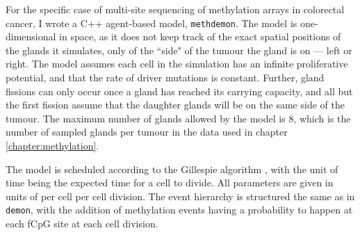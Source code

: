 For the specific case of multi-site sequencing of methylation arrays in colorectal cancer, I wrote
a C++ agent-based model, \texttt{methdemon}. The model is one-dimensional in space, as it does not
keep track of the exact spatial positions of the glands it simulates, only of the ``side" of the
tumour the gland is on --- left or right. The model assumes each cell in the simulation has an
infinite proliferative potential, and that the rate of driver mutations is constant. Further, gland
fissions can only occur once a gland has reached its carrying capacity, and all but the first fission
assume that the daughter glands will be on the same side of the tumour. The maximum number of glands
allowed by the model is $8$, which is the number of sampled glands per tumour in the data used in
chapter \ref{chapter:methylation}. \par
The model is scheduled according to the Gillespie algorithm \cite{gillespie_exact_1977}, with the
unit of time being the expected time for a cell to divide. All parameters are given in units of per
cell per cell division. The event hierarchy is structured the same as in \texttt{demon}, with the
addition of methylation events having a probability to happen at each fCpG site at each cell division.


